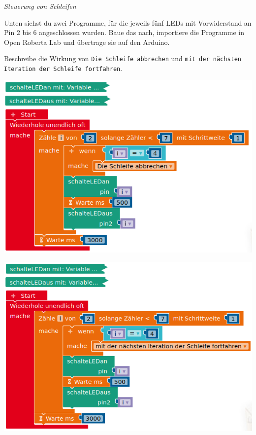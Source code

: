 \begin{aufgabe} \emph{Steuerung von Schleifen}
	
	Unten siehst du zwei Programme, für die jeweils fünf LEDs mit Vorwiderstand an Pin 2 bis 6 angeschlossen wurden. Baue das nach, importiere die Programme in Open Roberta Lab und übertrage sie auf den Arduino.
	
	Beschreibe die Wirkung von \texttt{Die Schleife abbrechen} und \texttt{mit der nächsten Iteration der Schleife fortfahren}.
	
	\bigskip
	\begin{minipage}{0.48\textwidth}
		\centering
		\includegraphics[width=\linewidth]{./pics/break-bsp.png}
		\bigskip
	\end{minipage}
	\hfill
	\begin{minipage}{0.48\textwidth}
		\centering
		\includegraphics[width=\linewidth]{./pics/continue-bsp.png}
		\bigskip
	\end{minipage}
\end{aufgabe}


